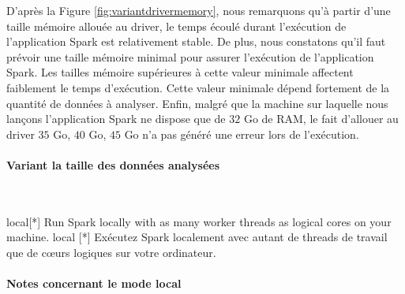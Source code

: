 D'après la Figure 	\ref{fig:variantdrivermemory}, nous remarquons qu'à partir d'une taille mémoire allouée au driver, le temps écoulé durant l'exécution de l'application Spark est relativement stable. De plus, nous constatons qu'il faut prévoir une taille mémoire minimal pour assurer l'exécution de l'application Spark. Les tailles mémoire supérieures à cette valeur minimale affectent faiblement le temps d'exécution.  Cette valeur minimale dépend fortement de la quantité de données à analyser. Enfin, malgré que la machine sur laquelle nous lançons l'application Spark ne dispose que de $ 32 $ Go de RAM, le fait d'allouer au driver $ 35 $ Go, $ 40$ Go, $ 45 $ Go n'a pas généré une erreur lors de l'exécution.

\paragraph{Variant la taille des données analysées}~

local[*] Run Spark locally with as many worker threads as logical cores on your machine.
local [*] Exécutez Spark localement avec autant de threads de travail que de c\oe{}urs logiques sur votre ordinateur.


\begin{table}[h]
\end{table}

\paragraph{Notes concernant le mode local}~

